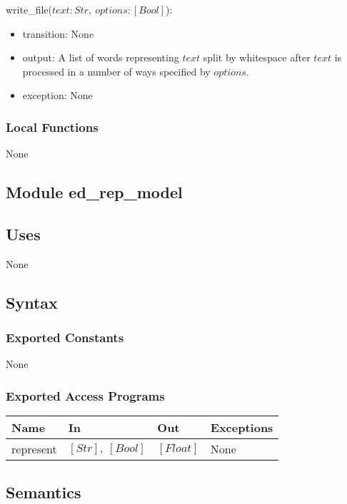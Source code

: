 \documentclass[12pt, titlepage]{article}
\begin{document}
\noindent write\_file($text: Str,\ options: [Bool]$):
\begin{itemize}
\item transition: None
\item output: A list of words representing $text$ split by whitespace after $text$ is processed in a number of ways specified by $options$.
\item exception: None
\end{itemize}

\subsubsection{Local Functions}

None


\subsection{Module ed\_rep\_model}

\subsection{Uses}

None

\subsection{Syntax}

\subsubsection{Exported Constants}

None

\subsubsection{Exported Access Programs}

\begin{center}
\begin{tabular}{p{3cm} p{4cm} p{4cm} p{3cm}}
\hline
\textbf{Name} & \textbf{In} & \textbf{Out} & \textbf{Exceptions} \\
\hline
represent & $[Str],\ [Bool]$ & $[Float]$ & None \\
\hline
\end{tabular}
\end{center}

\subsection{Semantics}
\end{document}
